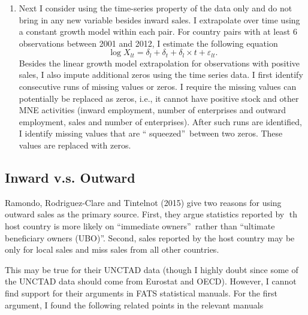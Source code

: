 \documentclass[notitlepage,11pt]{article}%
\begin{document}
\begin{enumerate}
\item Next I consider using the time-series property of the data only and do
not bring in any new variable besides inward sales. I extrapolate over time
using a constant growth model within each pair. For country pairs with at
least 6 observations between 2001 and 2012, I estimate the following equation%
\[
\log X_{lt}=\delta_{l}+\delta_{t}+\delta_{l}\times t+\varepsilon_{lt}.
\]
Besides the linear growth model extrapolation for observations with positive
sales, I also impute additional zeros using the time series data. I first
identify consecutive runs of missing values or zeros. I require the missing
values can potentially be replaced as zeros, i.e., it cannot have positive
stock and other MNE activities (inward employment, number of enterprises and
outward employment, sales and number of enterprises). \qquad After such runs
are identified, I identify missing values that are \textquotedblleft
squeezed\textquotedblright\ between two zeros. These values are replaced with zeros.
\end{enumerate}

\subsection{Inward v.s. Outward}

Ramondo, Rodriguez-Clare and Tintelnot (2015) give two reasons for using
outward sales as the primary source. First, they argue statistics reported by
th host country is more likely on \textquotedblleft immediate
owners\textquotedblright\ rather than \textquotedblleft ultimate beneficiary
owners (UBO)\textquotedblright. Second, sales reported by the host country may
be only for local sales and miss sales from all other countries.

This may be true for their UNCTAD data (though I highly doubt since some of
the UNCTAD data should come from Eurostat and OECD). However, I cannot find
support for their arguments in FATS statistical manuals. For the first
argument, I found the following related points in the relevant manuals
\end{document}
